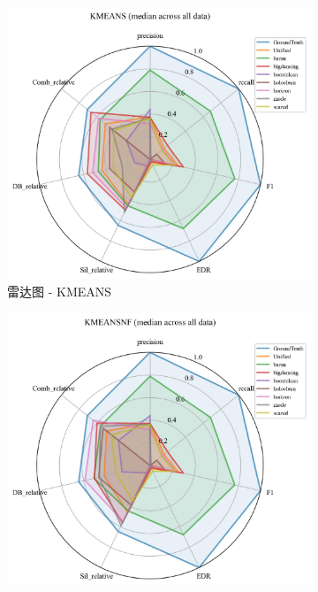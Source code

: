 \documentclass[10pt]{article} %
\numberwithin{equation}{section}
\begin{document}
\begin{enumerate}[label=(\alph*)]
\begin{figure}[htbp]
    \begin{subfigure}[b]{0.30\linewidth}
        \centering
        \includegraphics[width=\linewidth]{figures/radar graph/radar_KMEANS.pdf}
        \caption{雷达图 - KMEANS}
        \label{fig:radar_kmeans}
    \end{subfigure}
    \hfill
    \begin{subfigure}[b]{0.30\linewidth}
        \centering
        \includegraphics[width=\linewidth]{figures/radar graph/radar_KMEANSNF.pdf}

\end{subfigure}
\end{figure}
\end{enumerate}
\end{document}
